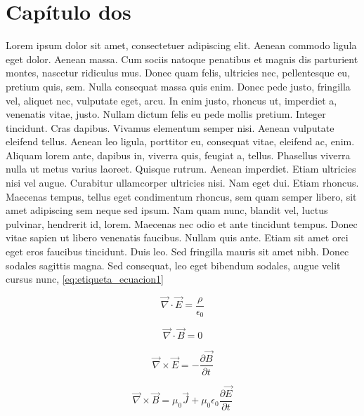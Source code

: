 \chapter{Capítulo dos}

Lorem ipsum dolor sit amet, consectetuer adipiscing elit. Aenean commodo ligula eget dolor. Aenean massa. Cum sociis natoque penatibus et magnis dis parturient montes, nascetur ridiculus mus. Donec quam felis, ultricies nec, pellentesque eu, pretium quis, sem. Nulla consequat massa quis enim. Donec pede justo, fringilla vel, aliquet nec, vulputate eget, arcu. In enim justo, rhoncus ut, imperdiet a, venenatis vitae, justo. Nullam dictum felis eu pede mollis pretium. Integer tincidunt. Cras dapibus. Vivamus elementum semper nisi. Aenean vulputate eleifend tellus. Aenean leo ligula, porttitor eu, consequat vitae, eleifend ac, enim. Aliquam lorem ante, dapibus in, viverra quis, feugiat a, tellus. Phasellus viverra nulla ut metus varius laoreet. Quisque rutrum. Aenean imperdiet. Etiam ultricies nisi vel augue. Curabitur ullamcorper ultricies nisi. Nam eget dui. Etiam rhoncus. Maecenas tempus, tellus eget condimentum rhoncus, sem quam semper libero, sit amet adipiscing sem neque sed ipsum. Nam quam nunc, blandit vel, luctus pulvinar, hendrerit id, lorem. Maecenas nec odio et ante tincidunt tempus. Donec vitae sapien ut libero venenatis faucibus. Nullam quis ante. Etiam sit amet orci eget eros faucibus tincidunt. Duis leo. Sed fringilla mauris sit amet nibh. Donec sodales sagittis magna. Sed consequat, leo eget bibendum sodales, augue velit cursus nunc,
\ref{eq:etiqueta_ecuacion1}

\begin{equation} \label{eq:etiqueta_ecuacion1}
	\vec{\nabla}\cdot \vec{E}= \dfrac{\rho}
{\epsilon_0}
\end{equation}

\begin{equation} \label{eq:etiqueta_ecuacion2}
	\vec{\nabla}\cdot \vec{B}= 0
\end{equation}

\begin{equation} \label{eq:etiqueta_ecuacion3}
\vec{\nabla}\times\vec{E}=-\dfrac{\partial 
\vec{B}}{\partial t}
\end{equation}

\begin{equation} \label{eq:etiqueta_ecuacion4}
\vec{\nabla}\times \vec{B}=\mu_0\vec{J}+\mu_0
\epsilon_0 \dfrac{\partial \vec{E}}
{\partial t}
\end{equation}


